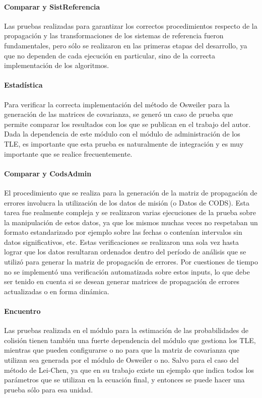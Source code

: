 \paragraph*{Comparar y SistReferencia}
Las pruebas realizadas para garantizar los correctos procedimientos respecto de la propagaci\'on y las transformaciones de los sistemas de referencia fueron fundamentales, pero s\'olo se realizaron en las primeras etapas del desarrollo, ya que no dependen de cada ejecuci\'on en particular, sino de la correcta implementaci\'on de los algoritmos.  

\paragraph*{Estad\'istica}
Para verificar la correcta implementaci\'on del m\'etodo de Osweiler para la generaci\'on de las matrices de covarianza, se gener\'o un caso de prueba que permite comparar los resultados con los que se publican en el trabajo del autor. Dada la dependencia de este m\'odulo con el m\'odulo de administraci\'on de los TLE, es importante que esta prueba es naturalmente de integraci\'on y es muy importante que se realice frecuentemente.

\paragraph*{Comparar y CodsAdmin}
El procedimiento que se realiza para la generaci\'on de la matriz de propagaci\'on de errores involucra la utilizaci\'on de los datos de misi\'on (o Datos de CODS). Esta tarea fue realmente compleja y se realizaron varias ejecuciones de la prueba sobre la manipulaci\'on de estos datos, ya que los mismos muchas veces no respetaban un formato estandarizado por ejemplo sobre las fechas o conten\'ian intervalos sin datos significativos, etc. Estas verificaciones se realizaron una sola vez hasta lograr que los datos resultaran ordenados dentro del per\'iodo de an\'alisis que se utiliz\'o para generar la matriz de propagaci\'on de errores. Por cuestiones de tiempo no se implement\'o una verificaci\'on automatizada sobre estos inputs, lo que debe ser tenido en cuenta si se desean generar matrices de propagaci\'on de errores actualizadas o en forma din\'amica.  

\paragraph*{Encuentro}
Las pruebas realizada en el m\'odulo para la estimaci\'on de las probabilidades de colisi\'on tienen tambi\'en una fuerte dependencia del m\'odulo que gestiona los TLE, mientras que pueden configurarse o no para que la matriz de covarianza que utilizan sea generada por el m\'odulo de Osweiler o no. Salvo para el caso del m\'etodo de Lei-Chen, ya que en su trabajo existe un ejemplo que indica todos los par\'ametros que se utilizan en la ecuaci\'on final, y entonces se puede hacer una prueba s\'olo para esa unidad.

